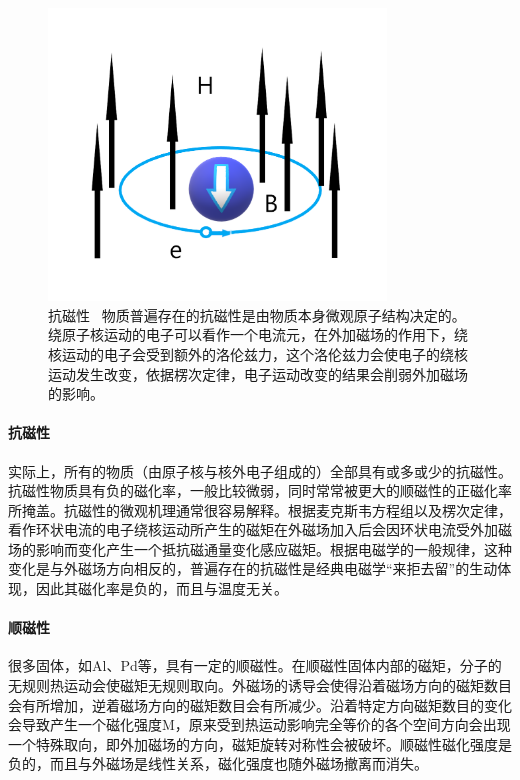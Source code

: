 \begin{figure}[h]
    \centering
\includegraphics[width=0.8\textwidth]{./pic/004-2.png}
\caption{抗磁性 \ 物质普遍存在的抗磁性是由物质本身微观原子结构决定的。绕原子核运动的电子可以看作一个电流元，在外加磁场的作用下，绕核运动的电子会受到额外的洛伦兹力，这个洛伦兹力会使电子的绕核运动发生改变，依据楞次定律，电子运动改变的结果会削弱外加磁场的影响。}

\label{dog004}
\end{figure}

\paragraph{抗磁性}

实际上，所有的物质（由原子核与核外电子组成的）全部具有或多或少的抗磁性。抗磁性物质具有负的磁化率，一般比较微弱，同时常常被更大的顺磁性的正磁化率所掩盖。抗磁性的微观机理通常很容易解释。根据麦克斯韦方程组以及楞次定律，看作环状电流的电子绕核运动所产生的磁矩在外磁场加入后会因环状电流受外加磁场的影响而变化产生一个抵抗磁通量变化感应磁矩。根据电磁学的一般规律，这种变化是与外磁场方向相反的，普遍存在的抗磁性是经典电磁学“来拒去留”的生动体现，因此其磁化率是负的，而且与温度无关。




\paragraph{顺磁性}
很多固体，如Al、Pd等，具有一定的顺磁性。在顺磁性固体内部的磁矩，分子的无规则热运动会使磁矩无规则取向。外磁场的诱导会使得沿着磁场方向的磁矩数目会有所增加，逆着磁场方向的磁矩数目会有所减少。沿着特定方向磁矩数目的变化会导致产生一个磁化强度M，原来受到热运动影响完全等价的各个空间方向会出现一个特殊取向，即外加磁场的方向，磁矩旋转对称性会被破坏。顺磁性磁化强度是负的，而且与外磁场是线性关系，磁化强度也随外磁场撤离而消失。



